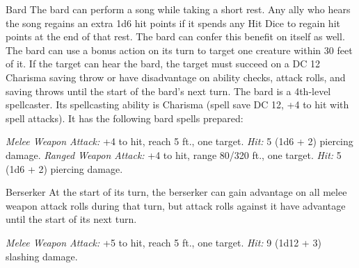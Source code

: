 \documentclass[10pt,a4paper,twoside,twocolumn,openany,bg=print,nodeprecatedcode]{dndbook}
\begin{document}
\begin{DndMonster}[float*=t]{Bard}
\DndMonsterBasics[
armor-class = {15 (chain shirt)},
hit-points = {\DndDice{8d8 + 8}},
speed = {30 ft.}
]
\DndMonsterAbilityScores[
 str = 11,
 dex = 14,
 con = 12,
 int = 10,
 wis = 13,
 cha = 14
]
\DndMonsterDetails[
saving-throws = {Dex +4, Wis +3},
skills = {Acrobatics +4, Perception +5, Performance +6},
languages = {any two languages},
challenge = 2,
]
The bard can perform a song while taking a short rest. Any ally who hears the song regains an extra 1d6 hit points if it spends any Hit Dice to regain hit points at the end of that rest. The bard can confer this benefit on itself as well.
The bard can use a bonus action on its turn to target one creature within 30 feet of it. If the target can hear the bard, the target must succeed on a DC 12 Charisma saving throw or have disadvantage on ability checks, attack rolls, and saving throws until the start of the bard's next turn.
The bard is a 4th-level spellcaster. Its spellcasting ability is Charisma (spell save DC 12, +4 to hit with spell attacks). It has the following bard spells prepared:
\begin{DndMonsterSpells}
\end{DndMonsterSpells}
\par
{}
\textsl{Melee Weapon Attack:} +4 to hit, reach 5 ft., one target. \textsl{Hit:} 5 (1d6 + 2) piercing damage.
\textsl{Ranged Weapon Attack:} +4 to hit, range 80/320 ft., one target. \textsl{Hit:} 5 (1d6 + 2) piercing damage.
\end{DndMonster}



\begin{DndMonster}[float*=t]{Berserker}
\DndMonsterBasics[
armor-class = {13 (hide armor)},
hit-points = {\DndDice{9d8 + 27}},
speed = {30 ft.}
]
\DndMonsterAbilityScores[
 str = 16,
 dex = 12,
 con = 17,
 int = 9,
 wis = 11,
 cha = 9
]
\DndMonsterDetails[
languages = {any one language (usually Common)},
challenge = 2,
]
At the start of its turn, the berserker can gain advantage on all melee weapon attack rolls during that turn, but attack rolls against it have advantage until the start of its next turn.
\par
{}
\textsl{Melee Weapon Attack:} +5 to hit, reach 5 ft., one target. \textsl{Hit:} 9 (1d12 + 3) slashing damage.
\end{DndMonster}
\end{document}
